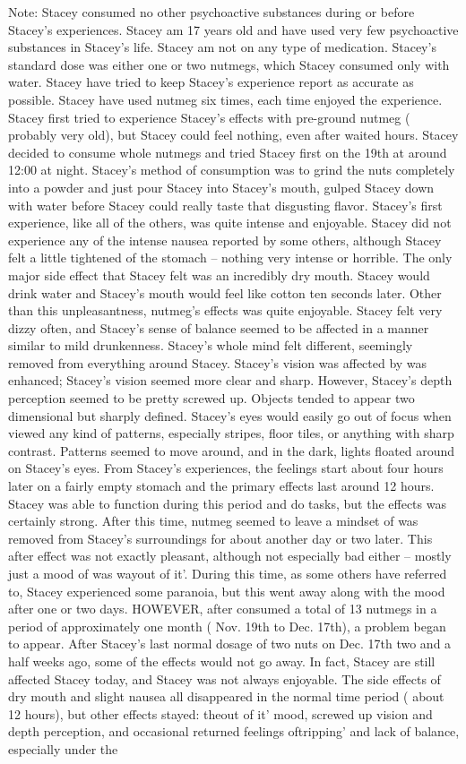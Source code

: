 \documentclass[12pt]{book}
\begin{document}
Note: Stacey consumed no other psychoactive substances during or before Stacey's experiences. Stacey am 17 years old and have used very few psychoactive substances in Stacey's life. Stacey am not on any type of medication. Stacey's standard dose was either one or two nutmegs, which Stacey consumed only with water. Stacey have tried to keep Stacey's experience report as accurate as possible. Stacey have used nutmeg six times, each time enjoyed the experience. Stacey first tried to experience Stacey's effects with pre-ground nutmeg ( probably very old), but Stacey could feel nothing, even after waited hours. Stacey decided to consume whole nutmegs and tried Stacey first on the 19th at around 12:00 at night. Stacey's method of consumption was to grind the nuts completely into a powder and just pour Stacey into Stacey's mouth, gulped Stacey down with water before Stacey could really taste that disgusting flavor. Stacey's first experience, like all of the others, was quite intense and enjoyable. Stacey did not experience any of the intense nausea reported by some others, although Stacey felt a little tightened of the stomach -- nothing very intense or horrible. The only major side effect that Stacey felt was an incredibly dry mouth. Stacey would drink water and Stacey's mouth would feel like cotton ten seconds later. Other than this unpleasantness, nutmeg's effects was quite enjoyable. Stacey felt very dizzy often, and Stacey's sense of balance seemed to be affected in a manner similar to mild drunkenness. Stacey's whole mind felt different, seemingly removed from everything around Stacey. Stacey's vision was affected by was enhanced; Stacey's vision seemed more clear and sharp. However, Stacey's depth perception seemed to be pretty screwed up. Objects tended to appear two dimensional but sharply defined. Stacey's eyes would easily go out of focus when viewed any kind of patterns, especially stripes, floor tiles, or anything with sharp contrast. Patterns seemed to move around, and in the dark, lights floated around on Stacey's eyes. From Stacey's experiences, the feelings start about four hours later on a fairly empty stomach and the primary effects last around 12 hours. Stacey was able to function during this period and do tasks, but the effects was certainly strong. After this time, nutmeg seemed to leave a mindset of was removed from Stacey's surroundings for about another day or two later. This after effect was not exactly pleasant, although not especially bad either -- mostly just a mood of was wayout of it'. During this time, as some others have referred to, Stacey experienced some paranoia, but this went away along with the mood after one or two days. HOWEVER, after consumed a total of 13 nutmegs in a period of approximately one month ( Nov. 19th to Dec. 17th), a problem began to appear. After Stacey's last normal dosage of two nuts on Dec. 17th two and a half weeks ago, some of the effects would not go away. In fact, Stacey are still affected Stacey today, and Stacey was not always enjoyable. The side effects of dry mouth and slight nausea all disappeared in the normal time period ( about 12 hours), but other effects stayed: theout of it' mood, screwed up vision and depth perception, and occasional returned feelings oftripping' and lack of balance, especially under the 
\end{document}
